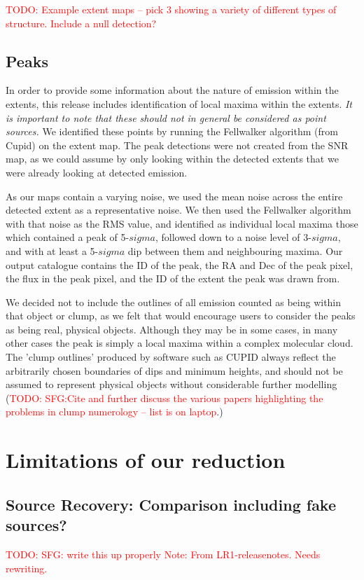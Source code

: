 \documentclass[usenatbib]{mnras}
\newcommand{\todo}[1]{\textcolor{red}{TODO: #1}}
\newcommand{\note}[1]{\textcolor{red}{Note: #1}}
\begin{document}
\todo{Example extent maps -- pick 3 showing a variety of different
  types of structure. Include a null detection?}

\subsection{Peaks}
In order to provide some information about the nature of emission
within the extents, this release includes identification of local
maxima within the extents. \emph{It is important to note that these
  should not in general be considered as point sources.} We identified
these points by running the Fellwalker algorithm (from Cupid) on the
extent map. The peak detections were not created from the SNR map, as
we could assume by only looking within the detected extents that we
were already looking at detected emission.

As our maps contain a varying noise, we used the mean noise across the
entire detected extent as a representative noise. We then used the
Fellwalker algorithm with that noise as the RMS value, and identified
as individual local maxima those which contained a peak of 5-$sigma$,
followed down to a noise level of 3-$sigma$, and with at least a
5-$sigma$ dip between them and neighbouring maxima. Our output
catalogue contains the ID of the peak, the RA and Dec of the peak
pixel, the flux in the peak pixel, and the ID of the extent the peak
was drawn from.

We decided not to include the outlines of all emission counted as
being within that object or clump, as we felt that would encourage
users to consider the peaks as being real, physical objects. Although
they may be in some cases, in many other cases the peak is simply a
local maxima within a complex molecular cloud. The 'clump outlines'
produced by software such as CUPID always reflect the arbitrarily
chosen boundaries of dips and minimum heights, and should not be
assumed to represent physical objects without considerable further
modelling (\todo{SFG:Cite and further discuss the various papers
  highlighting the problems in clump numerology -- list is on
  laptop}.)



\section{Limitations of our reduction}


\subsection{Source Recovery: Comparison including fake sources?}
\todo{SFG: write this up properly}
\note{From LR1-releasenotes. Needs rewriting.}
\end{document}
